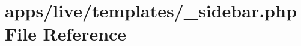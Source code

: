 \hypertarget{live_2templates_2__sidebar_8php}{\section{apps/live/templates/\-\_\-sidebar.php File Reference}
\label{live_2templates_2__sidebar_8php}
}

